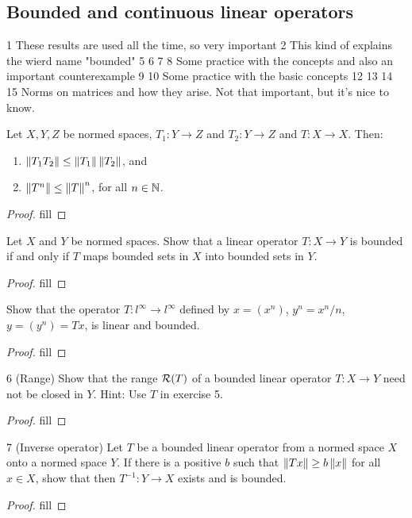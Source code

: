 \subsection{Bounded and continuous linear operators}

1 These results are used all the time, so very important
2 This kind of explains the wierd name "bounded"
5
6
7
8 Some practice with the concepts and also an important counterexample
9
10 Some practice with the basic concepts
12
13
14 
15 Norms on matrices and how they arise. Not that important, but it's nice to know.

\begin{exercise}{1}
Let $X,Y,Z$ be normed spaces, $T_1:Y\to Z$ and $T_2:Y\to Z$ and $T:X\to X$. Then:
\begin{enumerate}
    \item $\left\lVert T_1T_2\right\rVert\leq\left\lVert T_1\right\rVert\left\lVert T_2\right\rVert$, and
    \item $\left\lVert T^n\right\rVert\leq \left\lVert T\right\rVert^n$, for all $n\in\mathbb{N}$.
\end{enumerate}
\end{exercise}
\begin{proof}
fill
\end{proof}

\begin{exercise}{2}
Let $X$ and $Y$ be normed spaces. Show that a linear operator $T:X\to Y$ is bounded if and only if $T$ maps bounded sets in $X$ into bounded sets in $Y$.
\end{exercise}
\begin{proof}
fill
\end{proof}

\begin{exercise}{5}
Show that the operator $T:l^\infty\to l^\infty$ defined by $x=(x^n)$, $y^n=x^n/n$, $y =(y^n) =Tx$, is linear and bounded.
\end{exercise}
\begin{proof}
fill
\end{proof}

\begin{exercise}{6 (Range)}
Show that the range $\mathcal{R}(T)$ of a bounded linear operator $T:X\to Y$ need not be closed in $Y$. Hint: Use $T$ in exercise 5.
\end{exercise}
\begin{proof}
fill
\end{proof}

\begin{exercise}{7 (Inverse operator)}
Let $T$ be a bounded linear operator from a normed space $X$ onto a normed space $Y$. If there is a positive $b$ such that $\left\lVert Tx\right\rVert\geq b\left\lVert x\right\rVert$ for all $x\in X$, show that then $T^{-1}:Y\to X$ exists and is bounded.
\end{exercise}
\begin{proof}
fill
\end{proof}

